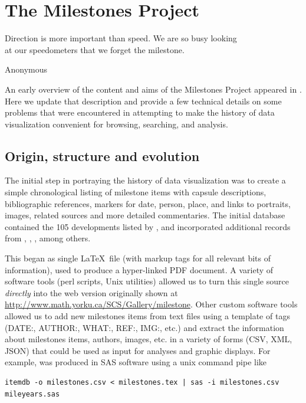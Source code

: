\section{The Milestones Project}\label{sec:project}
\epigraph{Direction is more important than speed. We are so busy looking \\ at our speedometers that we forget the milestone.}{Anonymous} %

An early overview of the content and aims of the Milestones Project appeared in \cite{Friendly:04:gfkl}. Here we update that description and provide a few technical details on some problems that were encountered in attempting to make the history of data visualization convenient for browsing, searching, and analysis.

\subsection{Origin, structure and evolution}\label{sec:structure}
The initial step in portraying the history of data visualization was to create a simple chronological listing of milestone items with capsule descriptions, bibliographic references, markers for date, person, place, and links to portraits, images, related sources and more detailed commentaries. The initial database contained the 105 developments listed by \citet{BenigerRobyn:1978}, and incorporated additional records from \citet{Hankins:1999}, \citet{Tufte:1983,Tufte:1990,Tufte:1997}, \citet{Heiser:2000}, among others.

This began as single \LaTeX\ file (with markup tags for all relevant bits of information), used to produce a hyper-linked PDF document.  A variety of software tools (perl scripts, Unix utilities) allowed us to turn this single source \emph{directly} into the web version originally shown at
\url{http://www.math.yorku.ca/SCS/Gallery/milestone}.  Other custom software tools allowed us to add new milestones items from text files using a template of tags (DATE:, AUTHOR:, WHAT:, REF:, IMG:, etc.) and extract the information about milestones items, authors, images, etc. in a variety of forms (CSV, XML, JSON) that could be used as input for analyses and graphic displays.  For example,  was produced in SAS software using a unix command pipe like 
\begin{verbatim} 
itemdb -o milestones.csv < milestones.tex | sas -i milestones.csv mileyears.sas 
\end{verbatim}

